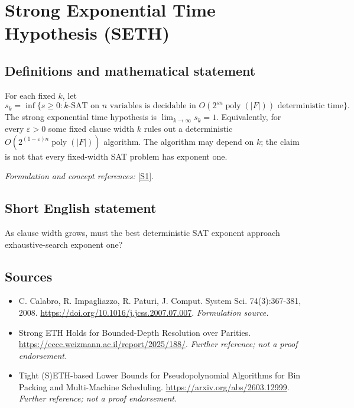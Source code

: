 \documentclass[11pt]{article}
\begin{document}
\section*{\texorpdfstring{Strong Exponential Time Hypothesis (SETH)}{Strong Exponential Time Hypothesis (SETH)}}\label{30006704}
\subsection{Definitions and mathematical statement}
For each fixed $k$, let
\[
 s_k=\inf\{s\ge0:k\text{-SAT on }n\text{ variables is decidable in }
 O(2^{sn}\operatorname{poly}(|F|))\text{ deterministic time}\}.
\]
The strong exponential time hypothesis is $\lim_{k\to\infty}s_k=1$. Equivalently, for every $\varepsilon>0$ some fixed clause width $k$ rules out a deterministic $O(2^{(1-\varepsilon)n}\operatorname{poly}(|F|))$ algorithm. The algorithm may depend on $k$; the claim is not that every fixed-width SAT problem has exponent one.
\par\smallskip\textit{Formulation and concept references:} \href{https://doi.org/10.1016/j.jcss.2007.07.007}{[S1]}.

\subsection{Short English statement}
As clause width grows, must the best deterministic SAT exponent approach exhaustive-search exponent one?
\subsection{Sources}
\begin{itemize}
\item[S1]C. Calabro, R. Impagliazzo, R. Paturi, J. Comput. System Sci. 74(3):367-381, 2008.
\url{https://doi.org/10.1016/j.jcss.2007.07.007}.
\textit{Formulation source.}
\item[S2]Strong ETH Holds for Bounded-Depth Resolution over Parities.
\url{https://eccc.weizmann.ac.il/report/2025/188/}.
\textit{Further reference; not a proof endorsement.}
\item[S3]Tight (S)ETH-based Lower Bounds for Pseudopolynomial Algorithms for Bin Packing and Multi-Machine Scheduling.
\url{https://arxiv.org/abs/2603.12999}.
\textit{Further reference; not a proof endorsement.}
\end{itemize}
\end{document}
